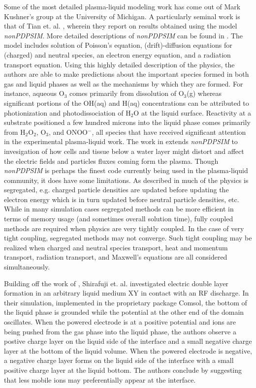 Some of the most detailed plasma-liquid modeling work has come out of Mark Kushner's group at the University of Michigan. A particularly seminal work is that of Tian et. al. \cite{Tian2014}, wherein they report on results obtained using the model \textit{nonPDPSIM}. More detailed descriptions of \textit{nonPDPSIM} can be found in \cite{lay2002breakdown,xiong2010surface}. The model includes solution of Poisson's equation, (drift)-diffusion equations for (charged) and neutral species, an electron energy equation, and a radiation transport equation. Using this highly detailed description of the physics, the authors are able to make predictions about the important species formed in both gas and liquid phases as well as the mechanisms by which they are formed. For instance, aqueous O$_3$ comes primarily from dissolution of O$_3$(g) whereas significant portions of the OH(aq) and H(aq) concentrations can be attributed to photionization and photodissociation of H$_2$O at the liquid surface. Reactivity at a substrate positioned a few hundred microns into the liquid phase comes primarily from H$_2$O$_2$, O$_3$, and ONOO$^-$, all species that have received significant attention in the experimental plasma-liquid work. The work in \cite{Babaeva2014b} extends \textit{nonPDPSIM} to invesigation of how cells and tissue below a water layer might distort and affect the electric fields and particles fluxes coming form the plasma. Though \textit{nonPDPSIM} is perhaps the finest code currently being used in the plasma-liquid community, it does have some limitations. As described in \cite{xiong2010surface} much of the physics is segregated, e.g. charged particle densities are updated before updating the electron energy which is in turn updated before neutral particle densities, etc. While in many simulation cases segregated methods can be more efficient in terms of memory usage (and sometimes overall solution time), fully coupled methods are required when physics are very tightly coupled. In the case of very tight coupling, segregated methods may not converge. Such tight coupling may be realized when charged and neutral species transport, heat and momentum transport, radiation transport, and Maxwell's equations are all considered simultaneously.

Building off the work of \cite{morrow2011time}, Shirafuji et. al. investigated electric double layer formation in an arbitrary liquid medium XY in contact with an RF discharge. \cite{shirafuji2014numerical} In their simulation, implemented in the proprietary package Comsol, the bottom of the liquid phase is grounded while the potential at the other end of the domain oscillates. When the powered electrode is at a positive potential and ions are being pushed from the gas phase into the liquid phase, the authors observe a postive charge layer on the liquid side of the interface and a small negative charge layer at the bottom of the liquid volume. When the powered electrode is negative, a negative charge layer forms on the liquid side of the interface with a small positive charge layer at the liquid bottom. The authors conclude by suggesting that less mobile ions may preferentially appear at the interface.


